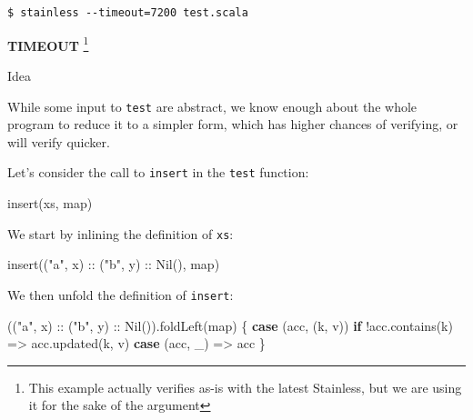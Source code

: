 \documentclass[ignorenonframetext,]{beamer}
\newenvironment{Shaded}{}{}
\newcommand{\FunctionTok}[1]{\textcolor[rgb]{0.02,0.16,0.49}{#1}}
\newcommand{\KeywordTok}[1]{\textcolor[rgb]{0.00,0.44,0.13}{\textbf{#1}}}
\newcommand{\NormalTok}[1]{#1}
\newcommand{\StringTok}[1]{\textcolor[rgb]{0.25,0.44,0.63}{#1}}
\begin{document}
\begin{frame}[fragile]

\begin{verbatim}
$ stainless --timeout=7200 test.scala
\end{verbatim}

\textbf{TIMEOUT}
\footnote{This example actually verifies as-is with the latest Stainless, but we are using it for the sake of the argument}

\end{frame}

\begin{frame}[fragile]{%
\protect\hypertarget{idea}{%
Idea}}

While some input to \texttt{test} are abstract, we know enough about the
whole program to reduce it to a simpler form, which has higher chances
of verifying, or will verify quicker.

\end{frame}

\begin{frame}[fragile]

Let’s consider the call to \texttt{insert} in the \texttt{test}
function:

\begin{Shaded}
\begin{Highlighting}[]
\FunctionTok{insert}\NormalTok{(xs, map)}
\end{Highlighting}
\end{Shaded}

\end{frame}

\begin{frame}[fragile]

We start by inlining the definition of \texttt{xs}:

\begin{Shaded}
\begin{Highlighting}[]
\FunctionTok{insert}\NormalTok{((}\StringTok{"a"}\NormalTok{, x) :: (}\StringTok{"b"}\NormalTok{, y) :: }\FunctionTok{Nil}\NormalTok{(), map)}
\end{Highlighting}
\end{Shaded}

\end{frame}

\begin{frame}[fragile]

We then unfold the definition of \texttt{insert}:

\begin{Shaded}
\begin{Highlighting}[]
\NormalTok{((}\StringTok{"a"}\NormalTok{, x) :: (}\StringTok{"b"}\NormalTok{, y) :: }\FunctionTok{Nil}\NormalTok{()).}\FunctionTok{foldLeft}\NormalTok{(map) \{}
  \KeywordTok{case}\NormalTok{ (acc, (k, v)) }\KeywordTok{if}\NormalTok{ !acc.}\FunctionTok{contains}\NormalTok{(k) => acc.}\FunctionTok{updated}\NormalTok{(k, v)}
  \KeywordTok{case}\NormalTok{ (acc, _)                          => acc}
\NormalTok{\}}
\end{Highlighting}
\end{Shaded}

\end{frame}
\end{document}
